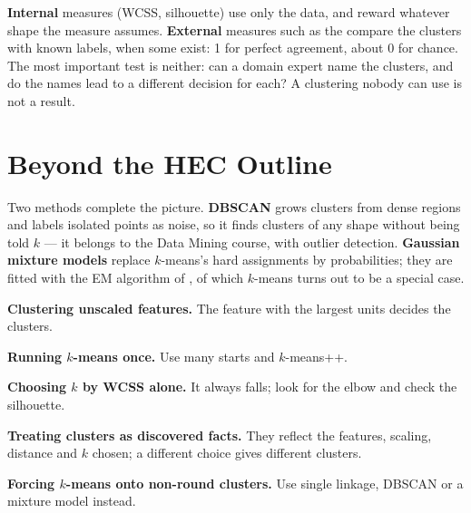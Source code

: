 \begin{alertbox}
\textbf{Internal} measures (WCSS, silhouette) use only the data, and reward whatever
shape the measure assumes. \textbf{External} measures such as the  compare the clusters with known labels, when some exist: 1 for perfect
agreement, about 0 for chance. The most important test is neither: can a domain
expert name the clusters, and do the names lead to a different decision for each?
A clustering nobody can use is not a result.
\end{alertbox}

\section{Beyond the HEC Outline}

Two methods complete the picture. \textbf{DBSCAN} grows clusters from dense regions
and labels isolated points as noise, so it finds clusters of any shape without being
told $k$ --- it belongs to the Data Mining course, with outlier detection.
\textbf{Gaussian mixture models} replace $k$-means's hard assignments by
probabilities; they are fitted with the EM algorithm of , of which
$k$-means turns out to be a special case.

\begin{pitfall}
\begin{tight}
  \item \textbf{Clustering unscaled features.} The feature with the largest units
        decides the clusters.
  \item \textbf{Running $k$-means once.} Use many starts and $k$-means++.
  \item \textbf{Choosing $k$ by WCSS alone.} It always falls; look for the elbow and
        check the silhouette.
  \item \textbf{Treating clusters as discovered facts.} They reflect the features,
        scaling, distance and $k$ chosen; a different choice gives different
        clusters.
  \item \textbf{Forcing $k$-means onto non-round clusters.} Use single linkage,
        DBSCAN or a mixture model instead.
\end{tight}
\end{pitfall}

